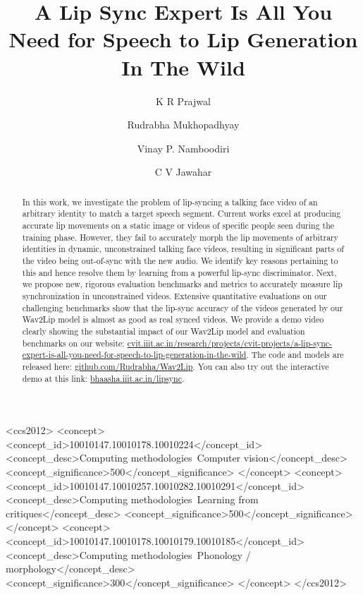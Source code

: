 \documentclass[sigconf]{acmart}
\begin{document}
\fancyhead{}

\title{A Lip Sync Expert Is All You Need for Speech to Lip Generation In The Wild}

\author{K R Prajwal}

\author{Rudrabha Mukhopadhyay}
\authornotemark[1]

\author{Vinay P. Namboodiri}

\author{C V Jawahar}

\renewcommand{\shortauthors}{Prajwal and Rudrabha, et al.}

\begin{abstract}
  In this work, we investigate the problem of lip-syncing a talking face video of an arbitrary identity to match a target speech segment. Current works excel at producing accurate lip movements on a static image or videos of specific people seen during the training phase. However, they fail to accurately morph the lip movements of arbitrary identities in dynamic, unconstrained talking face videos, resulting in significant parts of the video being out-of-sync with the new audio. We identify key reasons pertaining to this and hence resolve them by learning from a powerful lip-sync discriminator. Next, we propose new, rigorous evaluation benchmarks and metrics to accurately measure lip synchronization in unconstrained videos. Extensive quantitative evaluations on our challenging benchmarks show that the lip-sync accuracy of the videos generated by our Wav2Lip model is almost as good as real synced videos. We provide a demo video clearly showing the substantial impact of our Wav2Lip model and evaluation benchmarks on our website: \url{cvit.iiit.ac.in/research/projects/cvit-projects/a-lip-sync-expert-is-all-you-need-for-speech-to-lip-generation-in-the-wild}. The code and models are released here: \url{github.com/Rudrabha/Wav2Lip}. You can also try out the interactive demo at this link: \url{bhaasha.iiit.ac.in/lipsync}.
\end{abstract}

\begin{CCSXML}
<ccs2012>
<concept>
<concept_id>10010147.10010178.10010224</concept_id>
<concept_desc>Computing methodologies~Computer vision</concept_desc>
<concept_significance>500</concept_significance>
</concept>
<concept>
<concept_id>10010147.10010257.10010282.10010291</concept_id>
<concept_desc>Computing methodologies~Learning from critiques</concept_desc>
<concept_significance>500</concept_significance>
</concept>
<concept>
<concept_id>10010147.10010178.10010179.10010185</concept_id>
<concept_desc>Computing methodologies~Phonology / morphology</concept_desc>
<concept_significance>300</concept_significance>
</concept>
</ccs2012>
\end{CCSXML}
\end{document}
